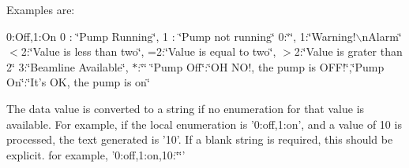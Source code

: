 Examples are:

0:Off,1:On 0 : \char`\"{}Pump Running\char`\"{}, 1 : \char`\"{}Pump not running\char`\"{} 0:\char`\"{}\char`\"{}, 1:\char`\"{}Warning!$\backslash$nAlarm\char`\"{} $<$2:\char`\"{}Value is less than two\char`\"{}, =2:\char`\"{}Value is equal to two\char`\"{}, $>$2:\char`\"{}Value is grater than 2\char`\"{} 3:\char`\"{}Beamline Available\char`\"{}, $\ast$:\char`\"{}\char`\"{} \char`\"{}Pump Off\char`\"{}:\char`\"{}OH NO!, the pump is OFF!\char`\"{},\char`\"{}Pump On\char`\"{}:\char`\"{}It's OK, the pump is on\char`\"{}

The data value is converted to a string if no enumeration for that value is available. For example, if the local enumeration is '0:off,1:on', and a value of 10 is processed, the text generated is '10'. If a blank string is required, this should be explicit. for example, '0:off,1:on,10:\char`\"{}\char`\"{}'

